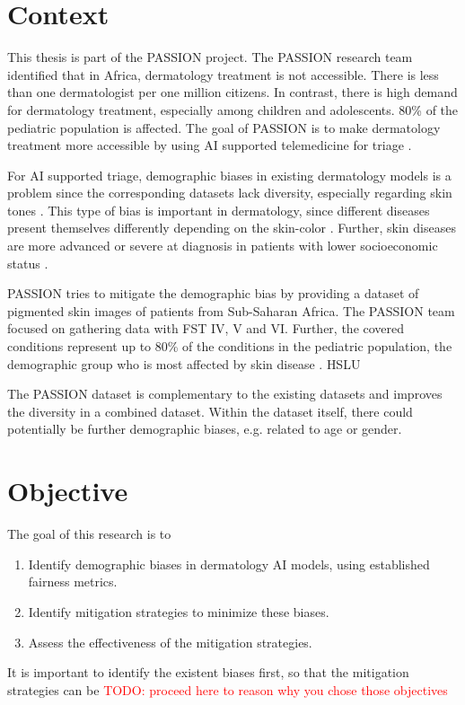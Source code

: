 \documentclass[12pt, a4paper, oneside]{book}   	%
\renewcommand{\todo}[1]{\textcolor{red}{TODO: #1}}
\begin{document}
	
		\section{Context}
			This thesis is part of the PASSION project. The PASSION research team identified that in Africa, dermatology treatment is not accessible. There is less than one dermatologist per one million citizens. In contrast, there is high demand for dermatology treatment, especially among children and adolescents. 80\% of the \gls{pediatric} population is affected. The goal of PASSION is to make dermatology treatment more accessible by using AI supported telemedicine for triage \autocite{Gottfrois2024}.
			
			For AI supported triage, demographic biases in existing dermatology models is a problem since the corresponding datasets lack diversity, especially regarding skin tones \autocite{Gottfrois2024}. This type of bias is important in dermatology, since different diseases present themselves differently depending on the skin-color \autocite{Diaz2022}. Further, skin diseases are more advanced or severe at diagnosis in patients with lower socioeconomic status \autocite{BAD2021}.
			
			PASSION tries to mitigate the demographic bias by providing a dataset of pigmented skin images of patients from Sub-Saharan Africa. The PASSION team focused on gathering data with \gls{FST} IV, V and VI. Further, the covered conditions represent up to 80\% of the conditions in the \gls{pediatric} population, the demographic group who is most affected by skin disease \autocite{Gottfrois2024}. \gls{HSLU}
			
			The PASSION dataset is complementary to the existing datasets and improves the diversity in a combined dataset. Within the dataset itself, there could potentially be further demographic biases, e.g. related to age or gender.
	
		\section{Objective}
			The goal of this research is to
			\begin{enumerate}
				\item Identify demographic biases in dermatology AI models, using established fairness metrics.
				\item Identify mitigation strategies to minimize these biases.
				\item Assess the effectiveness of the mitigation strategies.
			\end{enumerate}
			It is important to identify the existent biases first, so that the mitigation strategies can be \todo{proceed here to reason why you chose those objectives}
	
\end{document}
